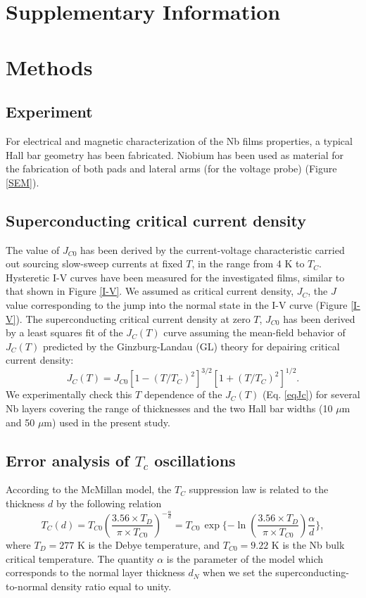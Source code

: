 \documentclass[reprint,onecolumn,superscriptaddress,a4paper,nofootinbib,floatfix]{revtex4-1}
\begin{document}
\section*{\Large{Supplementary Information}}

\section{Methods}

\subsection{Experiment}
For electrical and magnetic characterization of the Nb films properties, a typical Hall bar geometry has been fabricated. Niobium has been used as material for the fabrication of both pads and lateral arms (for the voltage probe) (Figure \ref{SEM}). 

\subsection{Superconducting critical current density}
The value of $J_{C0}$ has been derived by the current-voltage characteristic carried out sourcing slow-sweep currents at fixed $T$, in the range from 4 K to $T_C$. Hysteretic I-V curves  have been measured for the investigated films, similar to that shown in Figure \ref{I-V}. We assumed as critical current density, $J_C$, the $J$ value corresponding to the jump into the normal state in the I-V curve (Figure \ref{I-V}). The superconducting critical current density at zero $T$, $J_{C0}$ has been derived by a least squares fit of the $J_C(T)$ curve
assuming the mean-field behavior of $J_C(T)$ predicted by the Ginzburg-Landau (GL) theory for depairing critical current density:
\begin{equation}\tag{S1}
\label{eqJc}
J_C(T) = J_{C0}\left[1-(T/T_C)^2\right]^{3/2}\left[1+(T/T_C)^2\right]^{1/2}.
\end{equation}
We experimentally check this $T$ dependence of the $J_C(T)$ (Eq. \ref{eqJc}) for several Nb layers covering the range of thicknesses and the two Hall bar widths (10 $\mu$m and 50 $\mu$m) used in the present study. 

\subsection{Error analysis of $T_c$ oscillations}

According to the McMillan model, the $T_C$ suppression law is related to the thickness $d$ by the following relation 
\begin{equation}\tag{S2}
\label{Mcm}
T_C(d) = T_{C0}\left(\frac{3.56\times T_D}{\pi\times T_{C0}}\right)^{-\frac{\alpha}{d}} = T_{C0}\,\exp\biggl\lbrace{-\ln\left(\frac{3.56\times T_D}{\pi\times T_{C0}}\right)\frac{\alpha}{d}\biggr\rbrace},
\end{equation}
where $T_D = 277$ K is the Debye temperature, and $T_ {C0} = 9.22$ K is the Nb bulk critical temperature. The quantity $\alpha$ is the parameter of the model which corresponds to the normal layer thickness $d_N$ when we set the superconducting-to-normal density ratio equal to unity.
\end{document}
